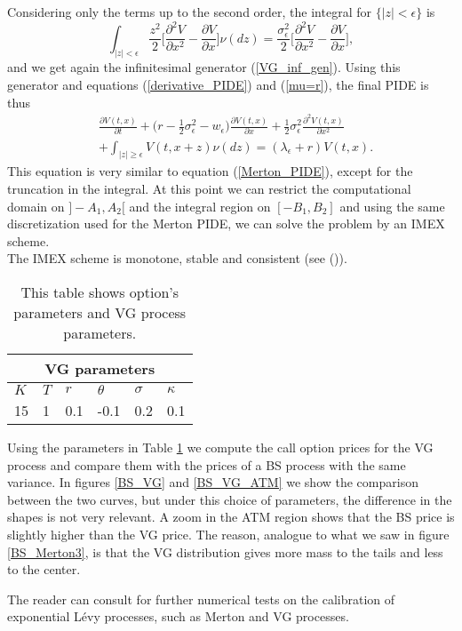 Considering only the terms up to the second order, the integral for $\{ |z| < \epsilon \}$ is
\begin{equation*}
 \int_{|z| < \epsilon} \frac{z^2}{2}
\biggl[ \frac{\partial^2 V}{\partial x^2} - \frac{\partial V}{\partial x} \biggr] \nu(dz)
= \frac{\sigma_{\epsilon}^2}{2} \biggl[ \frac{\partial^2 V}{\partial x^2} - \frac{\partial V}{\partial x} \biggr],
\end{equation*}
and we get again the infinitesimal generator (\ref{VG_inf_gen}).
Using this generator and equations (\ref{derivative_PIDE}) and (\ref{mu=r}), the final PIDE is thus
\begin{align}\label{VG_JD}
&  \frac{\partial V(t,x)}{\partial t} +
 \bigl( r-\frac{1}{2}\sigma_{\epsilon}^2 - w_{\epsilon} \bigr) \frac{\partial V(t,x)}{\partial x} 
 + \frac{1}{2}\sigma_{\epsilon}^2 \frac{\partial^2 V(t,x)}{\partial x^2} \\ \nonumber
 &+ \int_{|z| \geq \epsilon} V(t,x+z) \nu(dz) = (\lambda_{\epsilon} + r) V(t,x).
\end{align}
This equation is very similar to equation (\ref{Merton_PIDE}), except for the truncation in the integral. 
At this point we can restrict the computational domain on $]-A_1,A_2[$ and the integral region on $[-B_1,B_2]$ and using the same discretization
used for the Merton PIDE, we can solve the problem by an IMEX scheme.\\
The IMEX scheme is monotone, stable and consistent (see (\cite{CoVo05b})).
\begin{table}[h!]
\begin{center}
 \begin{minipage}{0.8\linewidth}
  \centering
 \begin{tabular}{||l|l|l|l||l|l||}
\hline
  \multicolumn{6}{|c|}{VG parameters} \\
 \hline
$K$ & $T$ & $r$ & $\theta$ & $\sigma$ &$\kappa$  \\
\hline
15 & 1 & 0.1 & -0.1 & 0.2 & 0.1 \\
\hline
\end{tabular}
  \caption{This table shows option's parameters and VG process parameters.}
  \label{tab:VG}
\end{minipage}
  \end{center}
\end{table}
Using the parameters in Table \ref{tab:VG} we compute the call option prices for the VG process and compare them with the prices of a BS process with the same variance.
In figures \ref{BS_VG} and \ref{BS_VG_ATM} we show the comparison between the two curves, but under this choice of parameters, the difference in the shapes is not very relevant.
A zoom in the ATM region shows that the BS price is slightly higher than the VG price. The reason, analogue to what we saw in figure \ref{BS_Merton3}, is that the VG distribution
gives more mass to the tails and less to the center.

The reader can consult \cite{Schoutens} for further numerical tests on the calibration of exponential Lévy processes, such as Merton and VG processes. 



